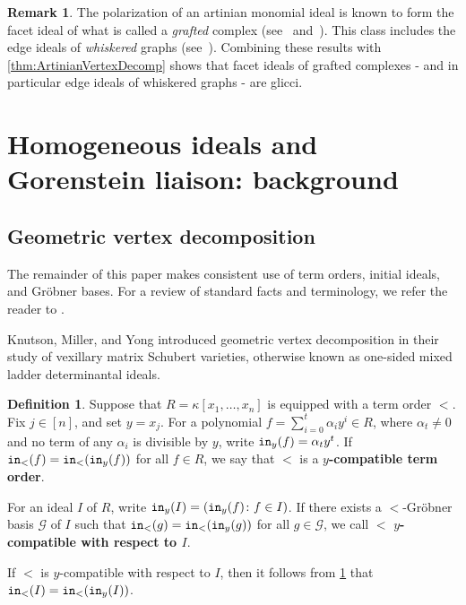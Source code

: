 \documentclass[12pt, reqno]{amsart}
\numberwithin{equation}{section}
\newtheorem{Main Conjecture}[theorem]{Main Conjecture}
\theoremstyle{definition}
\newtheorem{defn}[theorem]{Definition}
\newtheorem{remark}[theorem]{Remark}
\theoremstyle{plain}
\newcommand{\init}{{\tt in}}
\newcommand{\G}{\mathcal{G}}
\begin{document}
\begin{remark}\label{r:grafted} 
The polarization of an artinian monomial ideal is known to form the facet ideal of what is called a {\em grafted} complex (see~\cite{Fa2005}  and~\cite{CFHNVT2025}). This class includes the edge ideals of {\em whiskered} graphs (see~\cite{V1990}).  Combining these results with  \cref{thm:ArtinianVertexDecomp} shows that facet ideals of grafted complexes - and in particular edge ideals of  whiskered graphs - are glicci.  
\end{remark}


\section{Homogeneous ideals and Gorenstein liaison: background}\label{s:geometric-vertex-decomposition}
\subsection{Geometric vertex decomposition}\label{ss:gvd-background}

The remainder of this paper makes consistent use of term orders, initial ideals, and Gr\"obner bases.  For a review of standard facts and terminology, we refer the reader to \cite[Chapter 15]{Eis95}.

Knutson, Miller, and Yong \cite{KMY09} introduced geometric vertex decomposition in their study of vexillary matrix Schubert varieties, otherwise known as one-sided mixed ladder determinantal ideals.

\begin{defn}\label{def:ycomp}
Suppose that $R = \kappa[x_1, \ldots, x_n]$ is equipped with a term order $<$.  Fix $j \in [n]$, and set $y = x_j$. For a polynomial $f = \sum_{i=0}^t \alpha_i y^i \in R$, where $\alpha_t \neq 0$ and no term of any $\alpha_i$ is divisible by $y$, write $\init_{y} (f) = \alpha_t y^t$.  If $\init_<(f) = \init_<(\init_{y}(f))$ for all $f \in R$, we say that $<$ is a \textbf{$y$-compatible term order}.  

For an ideal $I$ of $R$, write $\init_{y}(I) = (\init_{y}(f) \colon f \in I)$.  If there exists a $<$-Gr\"obner basis $\G$ of $I$ such that $\init_<(g) = \init_<(\init_{y}(g))$ for all $g \in \G$, we call $<$ \textbf{$y$-compatible with respect to $I$}.  
\end{defn}

If $<$ is $y$-compatible with respect to $I$, then it follows from \cref{def:ycomp} that $\init_<(I) = \init_<(\init_{y}(I))$.
\end{document}
